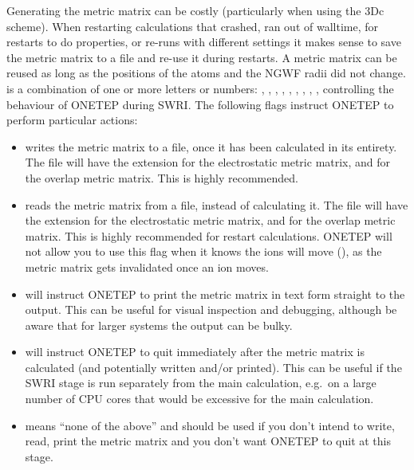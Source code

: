 \documentclass[letterpaper,10pt,english]{sphinxmanual}
\begin{document}
Generating the metric matrix can be costly (particularly when using the
3Dc scheme). When restarting calculations that crashed, ran out of
walltime, for restarts to do properties, or re-runs with different
settings it makes sense to save the metric matrix to a file and re-use
it during restarts. A metric matrix can be reused as long as the
positions of the atoms and the NGWF radii did not change.  is
a combination of one or more letters or numbers: , , ,
, , , , , , controlling the behaviour of
ONETEP during SWRI. The following flags instruct ONETEP to perform
particular actions:
\begin{itemize}
\item {} 
 \textendash{} writes the metric matrix to a file, once it has been
calculated in its entirety. The file will have the extension
 for the electrostatic metric matrix, and 
for the overlap metric matrix. This is highly recommended.

\item {} 
 \textendash{} reads the metric matrix from a file, instead of calculating
it. The file will have the extension  for the
electrostatic metric matrix, and  for the overlap metric
matrix. This is highly recommended for restart calculations. ONETEP
will not allow you to use this flag when it knows the ions will move
(), as the metric matrix gets invalidated once an ion
moves.

\item {} 
 \textendash{} will instruct ONETEP to print the metric matrix in text form
straight to the output. This can be useful for visual inspection and
debugging, although be aware that for larger systems the output can
be bulky.

\item {} 
 \textendash{} will instruct ONETEP to quit immediately after the metric
matrix is calculated (and potentially written and/or printed). This
can be useful if the SWRI stage is run separately from the main
calculation, e.g. on a large number of CPU cores that would be
excessive for the main calculation.

\item {} 
 \textendash{} means “none of the above” and should be used if you don’t
intend to write, read, print the metric matrix and you don’t want
ONETEP to quit at this stage.

\end{itemize}
\end{document}
